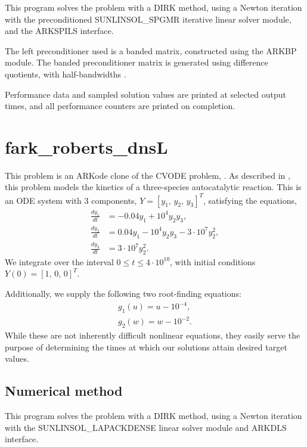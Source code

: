 \documentclass[letterpaper,10pt,english]{sphinxmanual}
\begin{document}
This program solves the problem with a DIRK method, using a Newton
iteration with the preconditioned SUNLINSOL\_SPGMR iterative linear
solver module, and the ARKSPILS interface.

The left preconditioner used is a banded matrix, constructed using
the ARKBP module.  The banded preconditioner matrix is generated using
difference quotients, with half-bandwidths .

Performance data and sampled solution values are printed at
selected output times, and all performance counters are printed
on completion.


\section{fark\_roberts\_dnsL}
\label{\detokenize{f77_serial:id3}}\label{\detokenize{f77_serial:fark-roberts-dnsl}}
This problem is an ARKode clone of the CVODE problem,
.  As described in \label{\detokenize{f77_serial:id4}}{\hyperref[\detokenize{References:hsr2017}]{\sphinxcrossref{{[}HSR2017{]}}}}, this problem models
the kinetics of a three-species autocatalytic reaction.  This is an
ODE system with 3 components, \(Y = [y_1,\, y_2,\, y_3]^T\),
satisfying the equations,
\begin{equation*}
\begin{split}\frac{d y_1}{dt} &= -0.04 y_1 + 10^4 y_2 y_3, \\
\frac{d y_2}{dt} &= 0.04 y_1 - 10^4 y_2 y_3 - 3\cdot10^7 y_2^2, \\
\frac{d y_3}{dt} &= 3\cdot10^7 y_2^2.\end{split}
\end{equation*}
We integrate over the interval \(0\le t\le 4\cdot10^{10}\), with initial
conditions  \(Y(0) = [1,\, 0,\, 0]^T\).

Additionally, we supply the following two root-finding equations:
\begin{equation*}
\begin{split}g_1(u) = u - 10^{-4}, \\
g_2(w) = w - 10^{-2}.\end{split}
\end{equation*}
While these are not inherently difficult nonlinear equations, they
easily serve the purpose of determining the times at which our
solutions attain desired target values.


\subsection{Numerical method}
\label{\detokenize{f77_serial:id5}}
This program solves the problem with a DIRK method, using a Newton
iteration with the SUNLINSOL\_LAPACKDENSE linear solver module and
ARKDLS interface.
\end{document}
